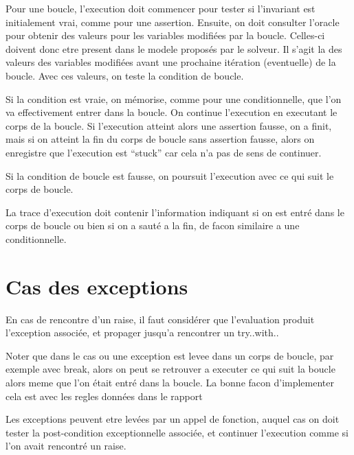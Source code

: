 \documentclass[a4paper,twoside]{article}
\begin{document}
Pour une boucle, l'execution doit commencer pour tester si l'invariant est
initialement vrai, comme pour une assertion. Ensuite, on doit consulter l'oracle
pour obtenir des valeurs pour les variables modifiées par la boucle. Celles-ci
doivent donc etre present dans le modele proposés par le solveur. Il s'agit la
des valeurs des variables modifiées avant une prochaine itération (eventuelle) de
la boucle. Avec ces valeurs, on teste la condition de boucle.

Si la condition est vraie, on mémorise, comme pour une conditionnelle, que l'on
va effectivement entrer dans la boucle. On continue l'execution en executant le
corps de la boucle. Si l'execution atteint alors une assertion fausse, on a
finit, mais si on atteint la fin du corps de boucle sans assertion fausse, alors
on enregistre que l'execution est ``stuck'' car cela n'a pas de sens de
continuer.

Si la condition de boucle est fausse, on poursuit l'execution avec ce qui suit
le corps de boucle.

La trace d'execution doit contenir l'information indiquant si on est entré dans
le corps de boucle ou bien si on a sauté a la fin, de facon similaire a une
conditionnelle.


\section{Cas des exceptions}

En cas de rencontre d'un raise, il faut considérer que l'evaluation produit
l'exception associée, et propager jusqu'a rencontrer un try..with..

Noter que dans le cas ou une exception est levee dans un corps de boucle, par
exemple avec break, alors on peut se retrouver a executer ce qui suit la boucle
alors meme que l'on était entré dans la boucle. La bonne facon d'implementer
cela est avec les regles données dans le rapport~\cite{becker21rr}

Les exceptions peuvent etre levées par un appel de fonction, auquel cas on doit
tester la post-condition exceptionnelle associée, et continuer l'execution comme
si l'on avait rencontré un raise.




%

\end{document}
